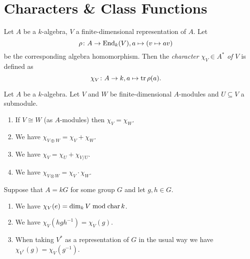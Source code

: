 \section{Characters \& Class Functions}


\begin{defi}
  Let $A$ be a $k$-algebra, $V$ a finite-dimensional representation of $A$. Let
  \[
    \rho \colon A \to \operatorname{End}_k(V), a \mapsto (v \mapsto av)
  \]
  be the corresponding algebra homomorphism. Then the \emph{character $\chi_V \in A^*$ of $V$} is defined as
  \[
    \chi_V \colon A \to k, a \mapsto \operatorname{tr} \rho(a).
  \]
\end{defi}


\begin{prop}\label{prop: properties characters}
  Let $A$ be a $k$-algebra. Let $V$ and $W$ be finite-dimensional $A$-modules and $U \subseteq V$ a submodule.
  \begin{enumerate}[label=\emph{\alph*)},leftmargin=*]
    \item
      If $V \cong W$ (as $A$-modules) then $\chi_V = \chi_W$.
    \item
      We have $\chi_{V \oplus W} = \chi_V + \chi_W$.
    \item
      We have $\chi_V = \chi_U + \chi_{V/U}$.
    \item
      We have $\chi_{V \otimes W} = \chi_V \cdot \chi_W$.
  \end{enumerate}
  Suppose that $A = kG$ for some group $G$ and let $g,h \in G$.
  \begin{enumerate}[label=\emph{\alph*)},leftmargin=*,resume]
    \item
      We have $\chi_V(e) = \dim_k V \bmod \operatorname{char} k$.
    \item
      We have $\chi_V(hgh^{-1}) = \chi_V(g)$.
    \item
      When taking $V^*$ as a representation of $G$ in the usual way we have $\chi_{V^*}(g) = \chi_V(g^{-1})$.
  \end{enumerate}
\end{prop}
